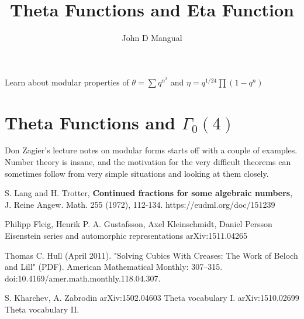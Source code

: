 \documentclass[12pt]{article}
\title{\textbf{ Theta Functions and Eta Function }}
\author{John D Mangual}
\date{}
\begin{document}
\selectfont \fontsize{20}{30}\selectfont

\maketitle

\noindent Learn about modular properties of $\theta = \sum q^{n^2}$ and  $\eta =  q^{1/24} \prod (1 - q^n)$

\section{  \selectfont Theta Functions and $\Gamma_0(4)$}

\noindent Don Zagier's lecture notes on modular forms starts off with a couple of examples.  Number theory is insane, and the motivation for the very difficult theorems can sometimes follow from very simple situations and looking at them closely. \newline

\newpage

\begin{thebibliography}{9}

 S. Lang and H. Trotter, \textbf{Continued fractions for some algebraic numbers}, J. Reine Angew. Math. 255 (1972), 112-134. https://eudml.org/doc/151239

 Philipp Fleig, Henrik P. A. Gustafsson, Axel Kleinschmidt, Daniel Persson
Eisenstein series and automorphic representations arXiv:1511.04265

  Thomas C. Hull (April 2011). "Solving Cubics With Creases: The Work of Beloch and Lill" (PDF). American Mathematical Monthly: 307–315. doi:10.4169/amer.math.monthly.118.04.307.

 S. Kharchev, A. Zabrodin \newline 
arXiv:1502.04603 Theta vocabulary I.  \newline
arXiv:1510.02699 Theta vocabulary II. \newline


\end{thebibliography}
\end{document}
